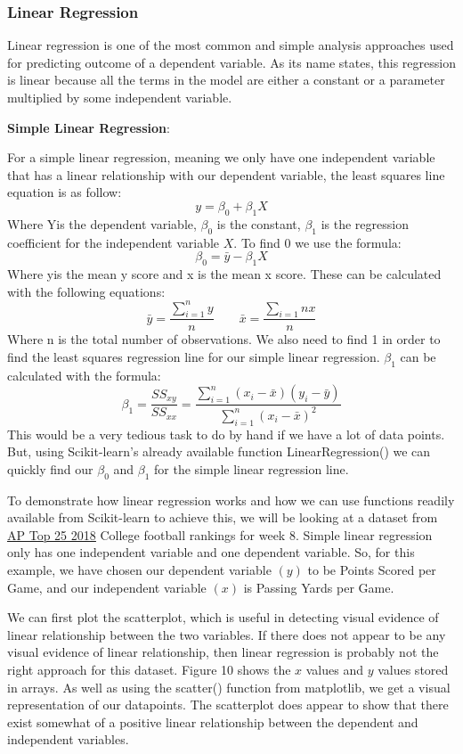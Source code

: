 \documentclass[a4paper,12pt]{report}
\newcommand{\link}[2]{\hyperlink{#1}{\underline{#2}}}
\newcommand{\msection}[1]{\noindent\textbf{#1}}
\begin{document}
\subsubsection{Linear Regression}

Linear regression is one of the most common and simple analysis approaches used for predicting outcome of a dependent variable. As its name states, this regression is linear because all the terms in the model are either a constant or a parameter multiplied by some independent variable.
 
\msection{Simple Linear Regression}:

For a simple linear regression, meaning we only have one independent variable that has a linear relationship with our dependent variable, the least squares line equation is as follow:
$$y=\beta_0+\beta_1X$$
Where Yis the dependent variable, $\beta_0$ is the constant, $\beta_1$ is the regression coefficient for the independent variable $X$.
To find 0 we use the formula:
$$\beta_0=\bar{y}-\beta_1X$$
Where yis the mean y score and x is the mean x score. These can be calculated with the following equations:
$$\bar{y}=\frac{\sum_{i=1}^ny}{n}\qquad\bar{x}=\frac{\sum_{i=1}nx}{n}$$
Where n is the total number of observations. We also need to find 1 in order to find the least squares regression line for our simple linear regression. $\beta_1$ can be calculated with the formula:
$$\beta_1=\frac{SS_{xy}}{SS_{xx}}=\frac{\sum_{i=1}^n(x_i-\bar{x})(y_i-\bar{y})}{\sum_{i=1}^n(x_i-\bar{x})^2}$$
This would be a very tedious task to do by hand if we have a lot of data points. But, using Scikit-learn’s already available function LinearRegression() we can quickly find our $\beta_0$ and $\beta_1$ for the simple linear regression line.

To demonstrate how linear regression works and how we can use functions readily available from Scikit-learn to achieve this, we will be looking at a dataset from \link{http://www.espn.com/college-football/rankings}{AP Top 25 2018} College football rankings for week 8. Simple linear regression only has one independent variable and one dependent variable. So, for this example, we have chosen our dependent variable $(y)$ to be Points Scored per Game, and our independent variable $(x)$ is Passing Yards per Game.

We can first plot the scatterplot, which is useful in detecting visual evidence of linear relationship between the two variables. If there does not appear to be any visual evidence of linear relationship, then linear regression is probably not the right approach for this dataset. Figure 10 shows the $x$ values and $y$ values stored in arrays. As well as using the scatter() function from matplotlib, we get a visual representation of our datapoints. The scatterplot does appear to show that there exist somewhat of a positive linear relationship between the dependent and independent variables. 
\end{document}
